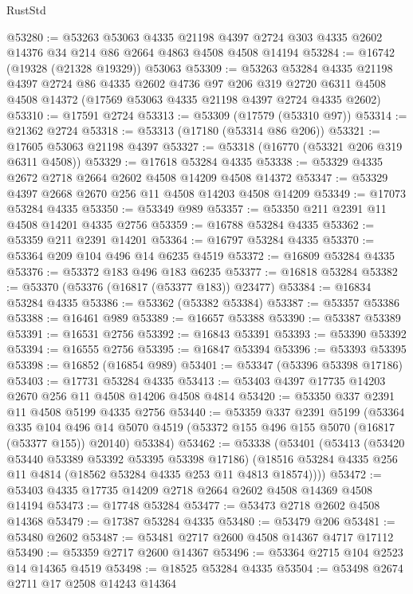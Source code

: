 \begin{lexlean}{RustStd}
\begin{coremodule}
@53280 := @53263
    @53063
    @4335
    @21198
    @4397
    @2724
    @303
    @4335
    @2602
    @14376
    @34
    @214
    @86
    @2664
    @4863
    @4508
    @4508
    @14194
@53284 := @16742 (@19328 (@21328 @19329)) @53063
@53309 := @53263
    @53284
    @4335
    @21198
    @4397
    @2724
    @86
    @4335
    @2602
    @4736
    @97
    @206
    @319
    @2720
    @6311
    @4508
    @4508
    @14372
    (@17569 @53063 @4335 @21198 @4397 @2724 @4335 @2602)
@53310 := @17591 @2724
@53313 := @53309 (@17579 (@53310 @97))
@53314 := @21362 @2724
@53318 := @53313 (@17180 (@53314 @86 @206))
@53321 := @17605 @53063 @21198 @4397
@53327 := @53318 (@16770 (@53321 @206 @319 @6311 @4508))
@53329 := @17618 @53284 @4335
@53338 := @53329 @4335 @2672 @2718 @2664 @2602 @4508 @14209 @4508 @14372
@53347 := @53329 @4397 @2668 @2670 @256 @11 @4508 @14203 @4508 @14209
@53349 := @17073 @53284 @4335
@53350 := @53349 @989
@53357 := @53350 @211 @2391 @11 @4508 @14201 @4335 @2756
@53359 := @16788 @53284 @4335
@53362 := @53359 @211 @2391 @14201
@53364 := @16797 @53284 @4335
@53370 := @53364 @209 @104 @496 @14 @6235 @4519
@53372 := @16809 @53284 @4335
@53376 := @53372 @183 @496 @183 @6235
@53377 := @16818 @53284
@53382 := @53370 (@53376 (@16817 (@53377 @183)) @23477)
@53384 := @16834 @53284 @4335
@53386 := @53362 (@53382 @53384)
@53387 := @53357 @53386
@53388 := @16461 @989
@53389 := @16657 @53388
@53390 := @53387 @53389
@53391 := @16531 @2756
@53392 := @16843 @53391
@53393 := @53390 @53392
@53394 := @16555 @2756
@53395 := @16847 @53394
@53396 := @53393 @53395
@53398 := @16852 (@16854 @989)
@53401 := @53347 (@53396 @53398 @17186)
@53403 := @17731 @53284 @4335
@53413 := @53403 @4397 @17735 @14203 @2670 @256 @11 @4508 @14206 @4508 @4814
@53420 := @53350 @337 @2391 @11 @4508 @5199 @4335 @2756
@53440 := @53359
    @337
    @2391
    @5199
    (@53364
      @335
      @104
      @496
      @14
      @5070
      @4519
      (@53372 @155 @496 @155 @5070 (@16817 (@53377 @155)) @20140)
      @53384)
@53462 := @53338
    (@53401
      (@53413
        (@53420 @53440 @53389 @53392 @53395 @53398 @17186)
        (@18516 @53284 @4335 @256 @11 @4814 (@18562 @53284 @4335 @253 @11 @4813 @18574))))
@53472 := @53403 @4335 @17735 @14209 @2718 @2664 @2602 @4508 @14369 @4508 @14194
@53473 := @17748 @53284
@53477 := @53473 @2718 @2602 @4508 @14368
@53479 := @17387 @53284 @4335
@53480 := @53479 @206
@53481 := @53480 @2602
@53487 := @53481 @2717 @2600 @4508 @14367 @4717 @17112
@53490 := @53359 @2717 @2600 @14367
@53496 := @53364 @2715 @104 @2523 @14 @14365 @4519
@53498 := @18525 @53284 @4335
@53504 := @53498 @2674 @2711 @17 @2508 @14243 @14364

\end{coremodule}
\end{lexlean}
